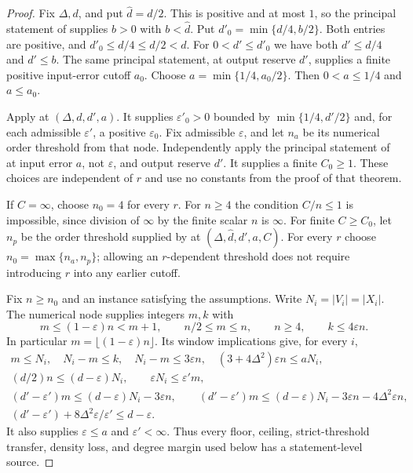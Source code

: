 \begin{proof}
Fix $\Delta,d$, and put $\widehat d=d/2$. This is positive and at most
$1$, so the principal statement of  supplies
$b>0$ with $b<\widehat d$. Put $d'_0=\min\{d/4,b/2\}$.
Both entries are positive, and $d'_0\leq d/4\leq d/2<d$.
For $0<d'\leq d'_0$ we have both $d'\leq d/4$ and $d'\leq b$.
The same principal statement, at output reserve $d'$, supplies a finite
positive input-error cutoff $a_0$. Choose
$a=\min\{1/4,a_0/2\}$. Then $0<a\leq1/4$ and $a\leq a_0$.

Apply  at $(\Delta,d,d',a)$.
It supplies $\varepsilon'_0>0$ bounded by $\min\{1/4,d'/2\}$ and,
for each admissible $\varepsilon'$, a positive $\varepsilon_0$.
Fix admissible $\varepsilon$, and let $n_a$ be its numerical order
threshold from that node. Independently apply the principal statement
of  at input error $a$, not $\varepsilon$,
and output reserve $d'$. It supplies a finite $C_0\geq1$.
These choices are independent of $r$ and use no constants from the proof
of that theorem.

If $C=\infty$, choose $n_0=4$ for every $r$.
For $n\geq4$ the condition $C/n\leq1$ is impossible, since division
of $\infty$ by the finite scalar $n$ is $\infty$.
For finite $C\geq C_0$, let $n_p$ be the order threshold supplied by
 at $(\Delta,\widehat d,d',a,C)$.
For every $r$ choose $n_0=\max\{n_a,n_p\}$; allowing an $r$-dependent
threshold does not require introducing $r$ into any earlier cutoff.

Fix $n\geq n_0$ and an instance satisfying the assumptions. Write
$N_i=|V_i|=|X_i|$. The numerical node supplies integers $m,k$ with
\[
 m\leq(1-\varepsilon)n<m+1,\qquad n/2\leq m\leq n,\qquad n\geq4,
 \qquad k\leq4\varepsilon n.
\]
In particular $m=\lfloor(1-\varepsilon)n\rfloor$.
Its window implications give, for every $i$,
\[
\begin{gathered}
 m\leq N_i,\quad N_i-m\leq k,\quad N_i-m\leq3\varepsilon n,\quad
 (3+4\Delta^2)\varepsilon n\leq aN_i,\\
 (d/2)n\leq(d-\varepsilon)N_i,\qquad
 \varepsilon N_i\leq\varepsilon'm,\\
 (d'-\varepsilon')m\leq(d-\varepsilon)N_i-3\varepsilon n,\qquad
 (d'-\varepsilon')m\leq(d-\varepsilon)N_i-3\varepsilon n
                                     -4\Delta^2\varepsilon n,\\
 (d'-\varepsilon')+8\Delta^2\varepsilon/\varepsilon'\leq d-\varepsilon.
\end{gathered}
\]
It also supplies $\varepsilon\leq a$ and $\varepsilon'<\infty$.
Thus every floor, ceiling, strict-threshold transfer, density loss,
and degree margin used below has a statement-level source.


\end{proof}
